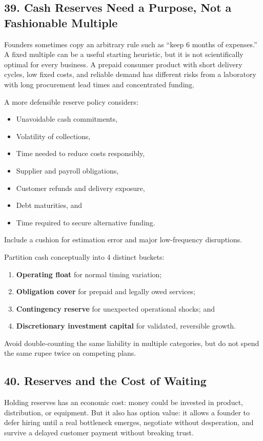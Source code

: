 \subsection*{39. Cash Reserves Need a Purpose, Not a Fashionable Multiple}

Founders sometimes copy an arbitrary rule such as ``keep 6 months of expenses.'' A fixed multiple can be a useful starting heuristic, but it is not scientifically optimal for every business. A prepaid consumer product with short delivery cycles, low fixed costs, and reliable demand has different risks from a laboratory with long procurement lead times and concentrated funding.

A more defensible reserve policy considers:
\begin{itemize}
\item Unavoidable cash commitments,
\item Volatility of collections,
\item Time needed to reduce costs responsibly,
\item Supplier and payroll obligations,
\item Customer refunds and delivery exposure,
\item Debt maturities, and
\item Time required to secure alternative funding.
\end{itemize}
Include a cushion for estimation error and major low-frequency disruptions.

Partition cash conceptually into 4 distinct buckets:
\begin{enumerate}
\item \textbf{Operating float} for normal timing variation;
\item \textbf{Obligation cover} for prepaid and legally owed services;
\item \textbf{Contingency reserve} for unexpected operational shocks; and
\item \textbf{Discretionary investment capital} for validated, reversible growth.
\end{enumerate}
Avoid double-counting the same liability in multiple categories, but do not spend the same rupee twice on competing plans.

\subsection*{40. Reserves and the Cost of Waiting}

Holding reserves has an economic cost: money could be invested in product, distribution, or equipment. But it also has option value: it allows a founder to defer hiring until a real bottleneck emerges, negotiate without desperation, and survive a delayed customer payment without breaking trust.

